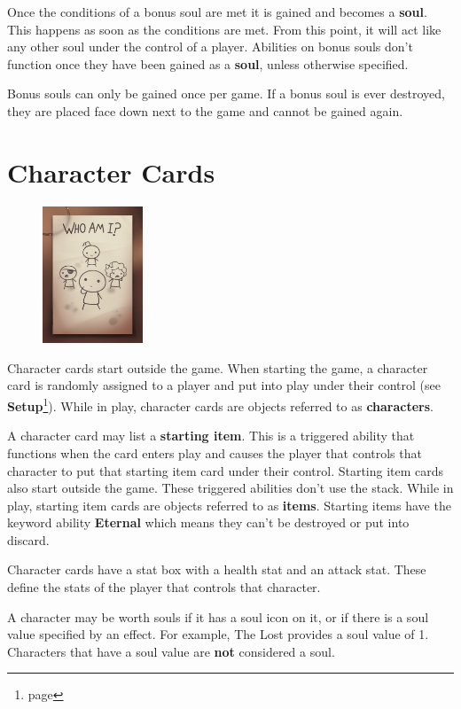 \documentclass[a4paper, twoside]{report} %
\begin{document}
    Once the conditions of a bonus soul are met it is gained and becomes a \textbf{soul}. This happens as soon as the conditions are met. From this point, it will act like any other soul under the control of a player. Abilities on bonus souls don’t function once they have been gained as a \textbf{soul}, unless otherwise specified.

    Bonus souls can only be gained once per game. If a bonus soul is ever destroyed, they are placed face down next to the game and cannot be gained again.

    \section{Character Cards}
    \begin{figure}
        \centering
        \includegraphics[width=30mm]{assets/character.png}
    \end{figure}
    Character cards start outside the game. When starting the game, a character card is randomly assigned to a player and put into play under their control (see \textbf{Setup}\footnote{page \pageref{setup}}). While in play, character cards are objects referred to as \textbf{characters}.
    
    A character card may list a \textbf{starting item}. This is a triggered ability that functions when the card enters play and causes the player that controls that character to put that starting item card under their control. Starting item cards also start outside the game. These triggered abilities don’t use the stack. While in play, starting item cards are objects referred to as \textbf{items}. Starting items have the keyword ability \textbf{Eternal} which means they can’t be destroyed or put into discard.
    
    Character cards have a stat box with a health stat and an attack stat. These define the stats of the player that controls that character.
    
    A character may be worth souls if it has a soul icon on it, or if there is a soul value specified by an effect. For example, The Lost provides a soul value of 1. Characters that have a soul value are \textbf{not} considered a soul.
\end{document}
